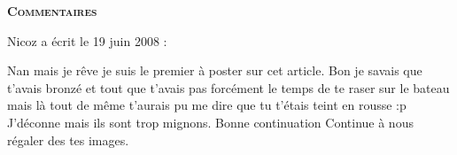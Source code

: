\bigskip
\textbf{\textsc{Commentaires}}

\medskip
Nicoz a écrit le 19 juin 2008 :
\begin{displayquote}
Nan mais je rêve je suis le premier à poster sur cet article.
Bon je savais que t'avais bronzé et tout que t'avais pas forcément le temps de te raser sur le bateau mais là tout de même t'aurais pu me dire que tu t'étais teint en rousse :p
J'déconne mais ils sont trop mignons.
Bonne continuation
Continue à nous régaler des tes images.
\end{displayquote}

\vfill
